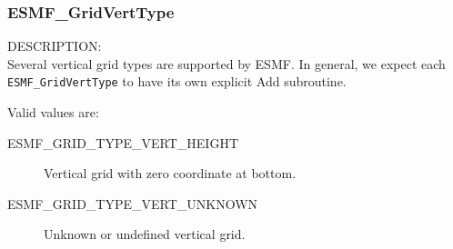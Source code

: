  \subsubsection{ESMF\_GridVertType}
 
 {\sf DESCRIPTION:\\}
 Several vertical grid types are supported by ESMF.  In general, we expect each
 {\tt ESMF\_GridVertType} to have its own explicit Add subroutine.
 
 Valid values are:
 \begin{description}
    \item [ESMF\_GRID\_TYPE\_VERT\_HEIGHT]
          Vertical grid with zero coordinate at bottom.
    \item [ESMF\_GRID\_TYPE\_VERT\_UNKNOWN]
          Unknown or undefined vertical grid.

 \end{description}

%
%


